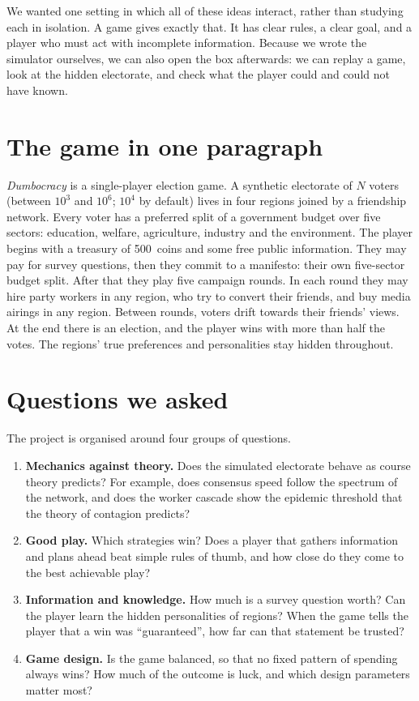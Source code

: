 \documentclass[11pt,a4paper,oneside]{report}
\newcommand{\coins}[1]{#1~coins}
\begin{document}
We wanted one setting in which all of these ideas interact, rather than studying each in isolation. A game
gives exactly that. It has clear rules, a clear goal, and a player who must act with incomplete
information. Because we wrote the simulator ourselves, we can also open the box afterwards: we can replay a
game, look at the hidden electorate, and check what the player could and could not have known.

\section{The game in one paragraph}

\emph{Dumbocracy} is a single-player election game. A synthetic electorate of $N$ voters (between $10^3$
and $10^6$; $10^4$ by default) lives in four regions joined by a friendship network. Every voter has a
preferred split of a government budget over five sectors: education, welfare, agriculture, industry and
the environment. The player begins with a treasury of \coins{500} and some free public information. They
may pay for survey questions, then they commit to a manifesto: their own five-sector budget split. After
that they play five campaign rounds. In each round they may hire party workers in any region, who try to
convert their friends, and buy media airings in any region. Between rounds, voters drift towards their
friends' views. At the end there is an election, and the player wins with more than half the votes. The
regions' true preferences and personalities stay hidden throughout.

\section{Questions we asked}

The project is organised around four groups of questions.
\begin{enumerate}[label=\textbf{Q\arabic*.}]
  \item \textbf{Mechanics against theory.} Does the simulated electorate behave as course theory predicts?
        For example, does consensus speed follow the spectrum of the network, and does the worker cascade
        show the epidemic threshold that the theory of contagion predicts?
  \item \textbf{Good play.} Which strategies win? Does a player that gathers information and plans ahead
        beat simple rules of thumb, and how close do they come to the best achievable play?
  \item \textbf{Information and knowledge.} How much is a survey question worth? Can the player learn the
        hidden personalities of regions? When the game tells the player that a win was ``guaranteed'',
        how far can that statement be trusted?
  \item \textbf{Game design.} Is the game balanced, so that no fixed pattern of spending always wins? How
        much of the outcome is luck, and which design parameters matter most?
\end{enumerate}
\end{document}
